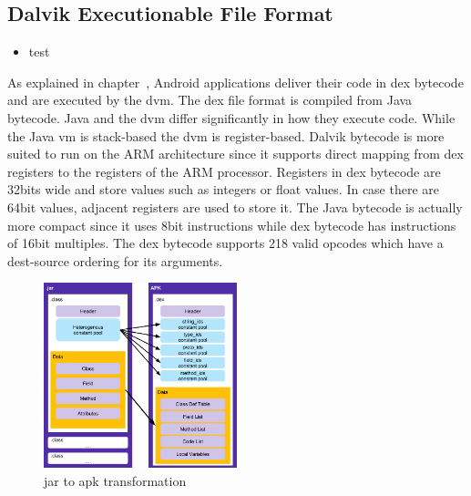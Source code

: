 \subsection{Dalvik Executionable File Format} \label{subsection:android-dex}
\begin{itemize}
    \item test
\end{itemize}
As explained in chapter~\cite{subsection:foundation-android-package}, Android applications deliver their code in \gls{dex} bytecode and are executed by the \gls{dvm}.
The dex file format is compiled from Java bytecode.
Java and the \gls{dvm} differ significantly in how they execute code.
While the Java \gls{vm} is stack-based the \gls{dvm} is register-based.
Dalvik bytecode is more suited to run on the ARM architecture since it supports direct mapping from dex registers to the registers of the ARM processor.
Registers in \gls{dex} bytecode are 32bits wide and store values such as integers or float values.
In case there are 64bit values, adjacent registers are used to store it.
The Java bytecode is actually more compact since it uses 8bit instructions while \gls{dex} bytecode has instructions of 16bit multiples.
The \gls{dex} bytecode supports 218 valid opcodes which have a dest-source ordering for its arguments.
\newline
\begin{figure}[h]
    \centering
    \includegraphics[width=0.5\textwidth]{data/java.png}
    \caption{\gls{jar} to \gls{apk} transformation \cite{googleDalvik}}
    \label{fig:java}
\end{figure}

